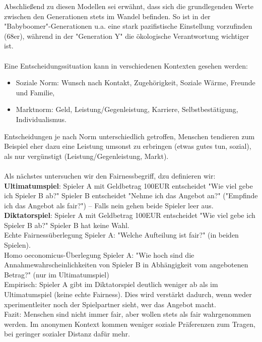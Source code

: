 Abschließend zu diesen Modellen sei erwähnt, dass sich die grundlegenden Werte zwischen den Generationen stets im Wandel befinden. So ist in der "Babyboomer"-Generationen u.a. eine stark pazifistische Einstellung vorzufinden (68er), während in der "Generation Y" die ökologische Verantwortung wichtiger ist.\\
\ \\
Eine Entscheidungssituation kann in verschiedenen Kontexten gesehen werden:
\begin{itemize}
	\item Soziale Norm: Wunsch nach Kontakt, Zugehörigkeit, Soziale Wärme, Freunde und Familie,
	\item Marktnorm: Geld, Leistung/Gegenleistung, Karriere, Selbstbestätigung, Individualismus.
\end{itemize}
Entscheidungen je nach Norm unterschiedlich getroffen, Menschen tendieren zum Beispiel eher dazu eine Leistung umsonst zu erbringen (etwas gutes tun, sozial), als nur vergünstigt (Leistung/Gegenleistung, Markt).\\
\ \\
Als nächstes untersuchen wir den Fairnessbegriff, dzu definieren wir:\\
\textbf{Ultimatumspiel}: Spieler A mit Geldbetrag 100EUR entscheidet "Wie viel gebe ich Spieler B ab?" Spieler B entscheidet "Nehme ich das Angebot an?" ("Empfinde ich das Angebot als fair?") -- Falls nein gehen beide Spieler leer aus.\\
\textbf{Diktatorspiel}: Spieler A mit Geldbetrag 100EUR entscheidet "Wie viel gebe ich Spieler B ab?" Spieler B hat keine Wahl.\\
Echte Fairnessüberlegung Spieler A: "Welche Aufteilung ist fair?" (in beiden Spielen).\\
Homo oeconomicus-Überlegung Spieler A: "Wie hoch sind die Annahmewahrscheinlichkeiten von Spieler B in Abhängigkeit vom angebotenen Betrag?" (nur im Ultimatumspiel)\\
Empirisch: Spieler A gibt im Diktatorspiel deutlich weniger ab als im Ultimatumspiel (keine echte Fairness). Dies wird verstärkt dadurch, wenn weder xperimentleiter noch der Spielpartner sieht, wer das Angebot macht.\\
Fazit: Menschen sind nicht immer fair, aber wollen stets als fair wahrgenommen werden. Im anonymen Kontext kommen weniger soziale Präferenzen zum Tragen, bei geringer sozialer Distanz dafür mehr.

